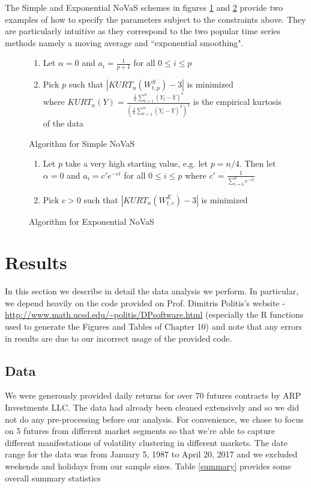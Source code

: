 \documentclass[11pt,]{article}
\begin{document}
The Simple and Exponential NoVaS schemes in figures \ref{simplenovas} and \ref{expnovas} provide two examples of how to specify the parameters subject to the constraints above. They are particularly intuitive as they correspond to the two popular time series methods namely a moving average and ``exponential smoothing".

\begin{figure}[ht]
\raggedright
\begin{enumerate}
\item{Let $\alpha=0$ and $a_i = \frac{1}{p+1}$ for all $0 \leq i \leq p$}
\item{Pick $p$ such that $|KURT_{n}(W_{t,p}^{S})-3|$ is minimized}\\
where $KURT_{n}(Y) = \frac{\frac{1}{n} \sum_{t=1}^{n} (Y_t - \bar{Y})^4}{(\frac{1}{n} \sum_{t=1}^{n} (Y_t - \bar{Y})^2)^2}$ is the empirical kurtosis of the data
\end{enumerate}
\caption{\label{simplenovas} Algorithm for Simple NoVaS}
\end{figure}

\begin{figure}[ht]
\raggedright
\begin{enumerate}
\item{Let $p$ take a very high starting value, e.g. let $p = n/4$. Then let $\alpha=0$ and $a_i = c'e^{-ci}$ for all $0 \leq i \leq p$ where $c' = \frac{1}{\sum_{i=0}^p e^{-ci}}$}
\item{Pick $c > 0$ such that $|KURT_{n}(W_{t,c}^{E})-3|$ is minimized}\\
\end{enumerate}
\caption{\label{expnovas} Algorithm for Exponential NoVaS}
\end{figure}


\section{Results}
In this section we describe in detail the data analysis we perform. In particular, we depend heavily on the code provided on Prof. Dimitris Politis's website - \url{http://www.math.ucsd.edu/~politis/DPsoftware.html} (especially the R functions used to generate the Figures and Tables of Chapter 10) and note that any errors in results are due to our incorrect usage of the provided code.

\subsection{Data}
We were generously provided daily returns for over 70 futures contracts by ARP Investments LLC. The data had already been cleaned extensively and so we did not do any pre-processing before our analysis. For convenience, we chose to focus on 5 futures from different market segments so that we're able to capture different manifestations of volatility clustering in different markets. The date range for the data was from January 5, 1987 to April 20, 2017 and we excluded weekends and holidays from our sample sizes. Table \ref{summary} provides some overall summary statistics
\end{document}
